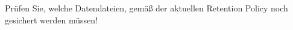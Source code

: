    \item Pr\"ufen Sie, welche Datendateien, gem\"a\ss{} der aktuellen Retention Policy noch gesichert werden m\"ussen!
